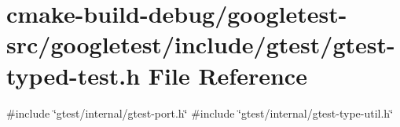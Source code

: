 \hypertarget{gtest-typed-test_8h}{}\section{cmake-\/build-\/debug/googletest-\/src/googletest/include/gtest/gtest-\/typed-\/test.h File Reference}
\label{gtest-typed-test_8h}
{\ttfamily \#include \char`\"{}gtest/internal/gtest-\/port.\+h\char`\"{}}\newline
{\ttfamily \#include \char`\"{}gtest/internal/gtest-\/type-\/util.\+h\char`\"{}}\newline

